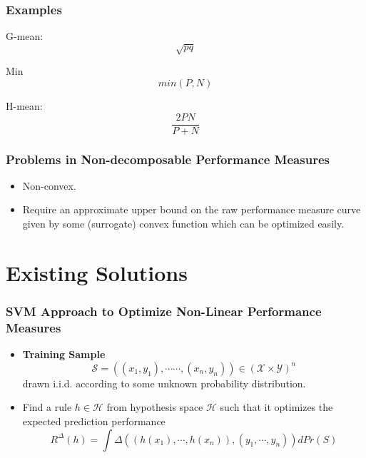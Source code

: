 \documentclass{beamer}
\begin{document}
\begin{frame}
	\frametitle{Examples}
	\begin{block}{G-mean:}
		\begin{equation*}
			\sqrt{pq}
		\end{equation*}
	\end{block} 
	\begin{block}{Min}
		\begin{equation*}
			min(P,N)
		\end{equation*}		
	\end{block}
	\begin{block}{H-mean:}
		\begin{equation*}
			\frac{2PN}{P+N}
		\end{equation*}		
	\end{block}
\end{frame}


\begin{frame}
	\frametitle{Problems in Non-decomposable Performance Measures}
	\begin{itemize}
		\item Non-convex.
		\item Require an approximate upper bound on the raw performance measure curve given by some (surrogate) convex function which can be optimized easily.
	\end{itemize}
\end{frame}


\section{Existing Solutions} %

\begin{frame}
	\frametitle{SVM Approach to Optimize Non-Linear Performance Measures}
	\begin{itemize} 
		\item \textbf{Training Sample}
		\begin{equation*}
		\mathcal{S} = ((x_1, y_1), \cdots \cdots, (x_n, y_n)) \in (\mathcal{X}\times \mathcal{Y})^n
		\end{equation*}
		drawn i.i.d. according to some unknown probability distribution.
		\item Find a rule $h \in \mathcal{H}$ from hypothesis space $\mathcal{H}$ such that it optimizes the expected prediction performance
		\begin{equation*}
		R^\Delta(h) = \int \Delta ((h(x_1), \cdots, h(x_n)), (y_1, \cdots, y_n))dPr(S)
		\end{equation*}
	\end{itemize}	
\end{frame}
\end{document}
